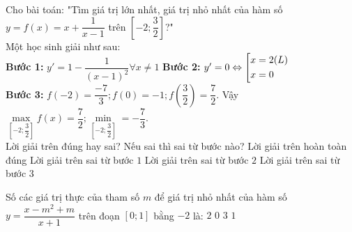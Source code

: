 \begin{ex}%
	Cho bài toán: "Tìm giá trị lớn nhất, giá trị nhỏ nhất của hàm số $y=f(x)=x+\dfrac{1}{x-1}$ trên $\left[-2;\dfrac{3}{2}\right]$?"\\
	Một học sinh giải như sau:\\
	\hskip 0.5cm \textbf{Bước 1:} $y'=1-\dfrac{1}{(x-1)^2} \forall x \ne 1$ \hskip 3cm \textbf{Bước 2:} $y' = 0 \Leftrightarrow \left[\begin{aligned}&x=2 (L)\\&x=0\end{aligned}\right.$ \\
	\hskip 0.5cm \textbf{Bước 3:} $f(-2) = \dfrac{-7}{3}; f(0) = -1; f\left(\dfrac{3}{2}\right) = \dfrac{7}{2}$. Vậy $\mathop {\max }\limits_{\left[ { - 2;\dfrac{3}{2}} \right]} f(x) = \dfrac{7}{2};\mathop {\min }\limits_{\left[ { - 2;\dfrac{3}{2}} \right]}  =  - \dfrac{7}{3}.$\\
	Lời giải trên đúng hay sai? Nếu sai thì sai từ bước nào?
	\haicot
	{Lời giải trên hoàn toàn đúng}
	{Lời giải trên sai từ bước $1$}
	{Lời giải trên sai từ bước $2$}
	{\True Lời giải trên sai từ bước $3$}
\end{ex}

\begin{ex}%
	Số các giá trị thực của tham số $m$ để giá trị nhỏ nhất của hàm số $y=\dfrac{x-m^2+m}{x+1}$ trên đoạn $[0;1]$ bằng $-2$ là:
	\choice
	{\True $2$}
	{$0$}
	{$3$}
	{$1$}
\end{ex}

